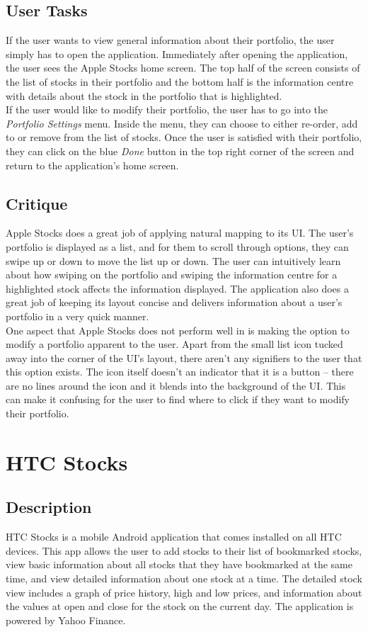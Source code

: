 \documentclass{sigchi}
\begin{document}
\subsection{User Tasks}
If the user wants to view general information about their portfolio, the user simply has to open the application. Immediately after opening the application, the user sees the Apple Stocks home screen. The top half of the screen consists of the list of stocks in their portfolio and the bottom half is the information centre with details about the stock in the portfolio that is highlighted. \\
If the user would like to modify their portfolio, the user has to go into the \textit{Portfolio Settings} menu. Inside the menu, they can choose to either re-order, add to or remove from the list of stocks. Once the user is satisfied with their portfolio, they can click on the blue \textit{Done} button in the top right corner of the screen and return to the application's home screen.

\subsection{Critique}
Apple Stocks does a great job of applying natural mapping to its UI. The user's portfolio is displayed as a list, and for them to scroll through options, they can swipe up or down to move the list up or down. The user can intuitively learn about how swiping on the portfolio and swiping the information centre for a highlighted stock affects the information displayed. The application also does a great job of keeping its layout concise and delivers information about a user's portfolio in a very quick manner. \\
One aspect that Apple Stocks does not perform well in is making the option to modify a portfolio apparent to the user. Apart from the small list icon tucked away into the corner of the UI's layout, there aren't any signifiers to the user that this option exists. The icon itself doesn't an indicator that it is a button – there are no lines around the icon and it blends into the background of the UI. This can make it confusing for the user to find where to click if they want to modify their portfolio.



\section{HTC Stocks}
\subsection{Description}
HTC Stocks is a mobile Android application that comes installed on all HTC devices.  This app allows the user to add stocks to their list of bookmarked stocks, view basic information about all stocks that they have bookmarked at the same time, and view detailed information about one stock at a time.  The detailed stock view includes a graph of price history, high and low prices, and information about the values at open and close for the stock on the current day.  The application is powered by Yahoo Finance.
\end{document}
